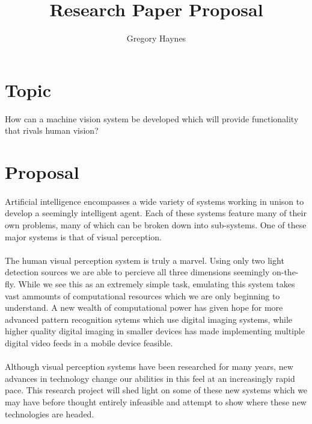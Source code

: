 \documentclass[a4paper,10pt]{article}
\title{Research Paper Proposal}
\author{Gregory Haynes}
\begin{document}
\maketitle

\section*{Topic}
How can a machine vision system be developed which will provide functionality that rivals human vision?

\section*{Proposal}
\paragraph{}Artificial intelligence encompasses a wide variety of systems working in unison to develop a seemingly intelligent agent.  Each of these systems feature many of their own problems, many of which can be broken down into sub-systems.  One of these major systems is that of visual perception.

\paragraph{}The human visual perception system is truly a marvel.  Using only two light detection sources we are able to percieve all three dimensions seemingly on-the-fly.  While we see this as an extremely simple task, emulating this system takes vast ammounts of computational resources which we are only beginning to understand.  A new wealth of computational power has given hope for more advanced pattern recognition sytems which use digital imaging systems, while higher quality digital imaging in smaller devices has made implementing multiple digital video feeds in a mobile device feasible.

\paragraph{}Although visual perception systems have been researched for many years, new advances in technology change our abilities in this feel at an increasingly rapid pace.  This research project will shed light on some of these new systems which we may have before thought entirely infeasible and attempt to show where these new technologies are headed.
\end{document}
